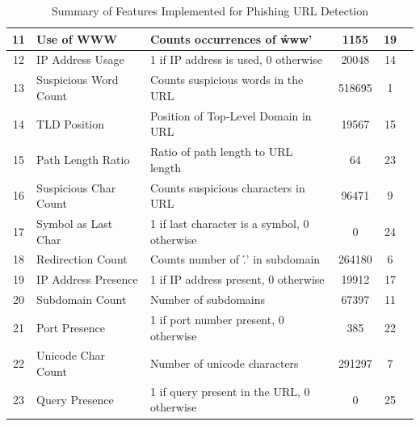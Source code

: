 \documentclass{article}
\begin{document}
\begin{table}[h]
\begin{tabular}{|c|l|p{6cm}|c|c|l|}
            11           & Use of WWW            & Counts occurrences of \'www'                 & 1155               & 19                   &                 \\ \hline
            12           & IP Address Usage      & 1 if IP address is used, 0 otherwise         & 20048              & 14                   &                 \\ \hline
            13           & Suspicious Word Count & Counts suspicious words in the URL           & 518695             & 1                    & \cite{PhishSafe} \cite{LexicalFeatureSelection}              \\ \hline
            14           & TLD Position          & Position of Top-Level Domain in URL          & 19567              & 15                   &  \cite{PhishSafe}               \\ \hline
            15           & Path Length Ratio     & Ratio of path length to URL length           & 64                 & 23                   &    \cite{LexicalFeatureSelection}             \\ \hline
            16           & Suspicious Char Count & Counts suspicious characters in URL          & 96471              & 9                    &    \cite{LexicalFeatureSelection}             \\ \hline
            17           & Symbol as Last Char   & 1 if last character is a symbol, 0 otherwise & 0                  & 24                   &    \cite{LexicalFeatureSelection}             \\ \hline
            18           & Redirection Count     & Counts number of \'.' in subdomain           & 264180             & 6                    &                 \\ \hline
            19           & IP Address Presence   & 1 if IP address present, 0 otherwise         & 19912              & 17                   &   \cite{PhishSafe} \cite{LexicalFeatureSelection}              \\ \hline
            20           & Subdomain Count       & Number of subdomains                         & 67397              & 11                   &    \cite{PhishSafe}             \\ \hline
            21           & Port Presence         & 1 if port number present, 0 otherwise        & 385                & 22                   &   \cite{LexicalFeatureSelection}              \\ \hline
            22           & Unicode Char Count    & Number of unicode characters                 & 291297             & 7                    &    \cite{LexicalFeatureSelection}             \\ \hline
            23           & Query Presence        & 1 if query present in the URL, 0 otherwise   & 0                  & 25                   &    \cite{LexicalFeatureSelection}             \\ \hline
        \end{tabular}
        \caption{Summary of Features Implemented for Phishing URL Detection}
        \label{tab:features}
    \end{table}
\end{document}

